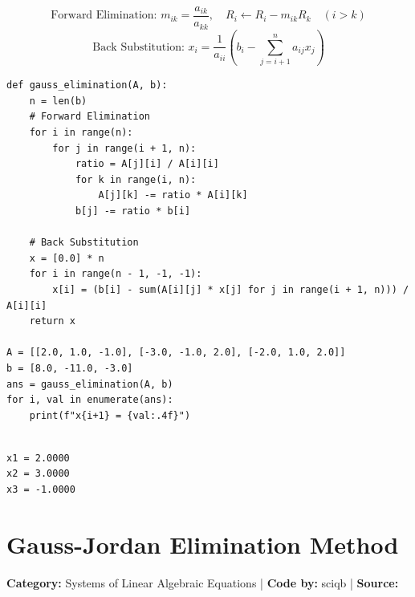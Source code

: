 \documentclass[10pt,a4paper]{report}
\begin{document}
\begin{tcolorbox}[colback=theorybg,colframe=theoryframe,title=\textbf{Mathematical Theory \& Formulation},boxrule=1pt,arc=2mm]
\[
\text{Forward Elimination: } m_{ik} = \frac{a_{ik}}{a_{kk}}, \quad R_i \leftarrow R_i - m_{ik} R_k \quad (i > k)
\]
\[
\text{Back Substitution: } x_i = \frac{1}{a_{ii}}\left(b_i - \sum_{j=i+1}^n a_{ij} x_j\right)
\]
\end{tcolorbox}

\begin{tcolorbox}[colback=codebg,colframe=secondary,title=\textbf{Python Implementation (Step-by-Step Functions)},boxrule=1pt,arc=2mm]
\begin{lstlisting}[style=python_detailed]
def gauss_elimination(A, b):
    n = len(b)
    # Forward Elimination
    for i in range(n):
        for j in range(i + 1, n):
            ratio = A[j][i] / A[i][i]
            for k in range(i, n):
                A[j][k] -= ratio * A[i][k]
            b[j] -= ratio * b[i]

    # Back Substitution
    x = [0.0] * n
    for i in range(n - 1, -1, -1):
        x[i] = (b[i] - sum(A[i][j] * x[j] for j in range(i + 1, n))) / A[i][i]
    return x

A = [[2.0, 1.0, -1.0], [-3.0, -1.0, 2.0], [-2.0, 1.0, 2.0]]
b = [8.0, -11.0, -3.0]
ans = gauss_elimination(A, b)
for i, val in enumerate(ans):
    print(f"x{i+1} = {val:.4f}")


\end{lstlisting}
\end{tcolorbox}

\begin{tcolorbox}[colback=termbg,colframe=primary,title=\textbf{Program Execution Output \& Convergence Table},boxrule=1pt,arc=2mm]
\begin{lstlisting}[style=terminal_output]
x1 = 2.0000
x2 = 3.0000
x3 = -1.0000
\end{lstlisting}
\end{tcolorbox}

\newpage


\section{Gauss-Jordan Elimination Method}
\textbf{Category:} \textcolor{secondary}{Systems of Linear Algebraic Equations} \quad | \quad \textbf{Code by:} \textcolor{secondary}{sciqb} \quad | \quad \textbf{Source:} \texttt{}
\end{document}
